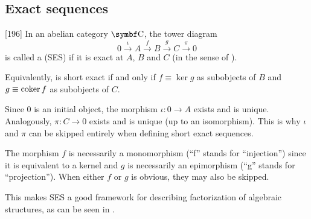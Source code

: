 \subsection{Exact sequences}\label{subsec:exact_sequences}

\begin{definition}\label{def:short_exact_sequence}\cite{MacLane1994}[196]
  In an abelian category \( \Cat{C} \), the tower diagram
  \begin{equation}\label{def:short_exact_sequence/diagram}
    0
    \overset \iota \longrightarrow
    A
    \overset f \longrightarrow
    B
    \overset g \longrightarrow
    C
    \overset \pi \longrightarrow
    0
  \end{equation}
  is called a  (SES) if it is exact at \( A \), \( B \) and \( C \) (in the sense of ).

  Equivalently,  is short exact if and only if \( f \equiv \ker g \) as subobjects of \( B \) and \( g \equiv \operatorname{co}\!\ker f \) as subobjects of \( C \).
\end{definition}

\begin{remark}\label{remark:short_exact_sequence_factorization}
  Since \( 0 \) is an initial object, the morphism \( \iota: 0 \to A \) exists and is unique. Analogously, \( \pi: C \to 0 \) exists and is unique (up to an isomorphism). This is why \( \iota \) and \( \pi \) can be skipped entirely when defining short exact sequences.

  The morphism \( f \) is necessarily a monomorphism (\enquote{f} stands for \enquote{injection}) since it is equivalent to a kernel and \( g \) is necessarily an epimorphism (\enquote{g} stands for \enquote{projection}). When either \( f \) or \( g \) is obvious, they may also be skipped.

  This makes SES a good framework for describing factorization of algebraic structures, as can be seen in .
\end{remark}

